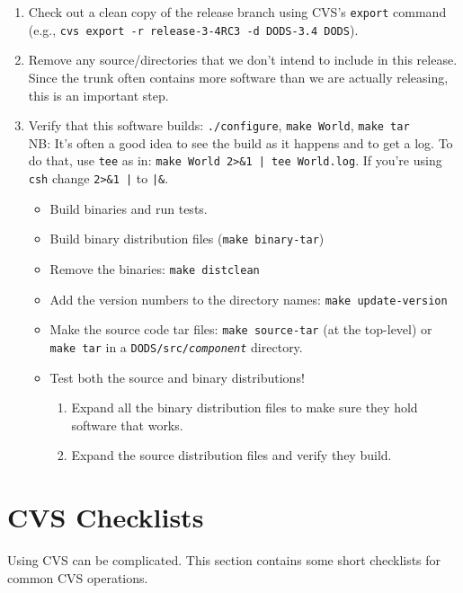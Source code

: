 \documentclass{dods-paper}
\begin{document}
\begin{enumerate}

\item Check out a clean copy of the release branch using CVS's
  \texttt{export} command (e.g., \texttt{cvs export -r release-3-4RC3 -d
    DODS-3.4 DODS}).
\item Remove any source/directories that we don't intend to include in this
  release. Since the trunk often contains more software than we are actually
  releasing, this is an important step. 
\item Verify that this software builds: \texttt{./configure},
  \texttt{make World}, \texttt{make tar}\\
  NB: It's often a good idea to see
  the build as it happens and to get a log. To do that, use \texttt{tee} as
  in: \texttt{make World 2>\&1 | tee World.log}. If you're using \texttt{csh}
  change \texttt{2>\&1 |} to \texttt{|\&}.
  \begin{itemize}
  \item Build binaries and run tests.
  \item Build binary distribution files (\texttt{make binary-tar})
  \item Remove the binaries: \texttt{make distclean}
  \item Add the version numbers to the directory names: \texttt{make
    update-version}
  \item Make the source code tar files: \texttt{make source-tar} (at the
    top-level) or \texttt{make tar} in a \texttt{DODS/src/{\em component}}
    directory.
  \item Test both the source and binary distributions!
    \begin{enumerate}
    \item Expand all the binary distribution files to make sure they
      hold software that works.
    \item Expand the source distribution files and verify they build.
    \end{enumerate}
  \end{itemize}

\end{enumerate}

\section{CVS Checklists}

Using CVS can be complicated. This section contains some short checklists for
common CVS operations.
\end{document}
